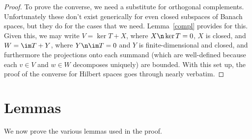 \documentclass[12pt]{article}
\begin{document}
\begin{proof}
To prove the converse, we need a substitute for orthogonal complements. Unfortunately these don't exist generically for even closed subspaces of Banach spaces, but they do for the cases that we need. Lemma~\ref{compl} provides for this. Given this, we may write $V = \ker T + X$, where $X \n \ker T = 0$, $X$ is closed, and $W = \im T + Y$, where $Y\n \im T = 0$ and $Y$ is finite-dimensional and closed, and furthermore the projections onto each summand (which are well-defined because each $v \in V$ and $w \in W$ decomposes uniquely) are bounded. With this set up, the proof of the converse for Hilbert spaces goes through nearly verbatim. \end{proof}

\section{Lemmas}
We now prove the various lemmas used in the proof.
\end{document}
